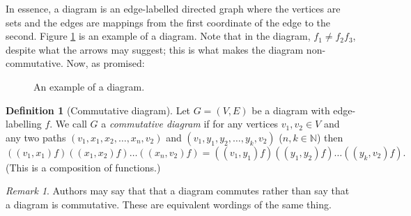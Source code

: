 \documentclass[12pt]{article}
\theoremstyle{definition}
\newtheorem{definition}{Definition}
\theoremstyle{remark}
\newtheorem*{remark}{Remark}
\begin{document}
In essence, a diagram is an edge-labelled directed graph where the vertices are sets and the edges are mappings from the first coordinate of the edge to the second. Figure \ref{fig:diag} is an example of a diagram. Note that in the diagram, $f_1 \neq f_2f_3$, despite what the arrows may suggest; this is what makes the diagram non-commutative. Now, as promised:

\begin{figure}[h]
  \centering

  \caption{An example of a diagram.}
  \label{fig:diag}
\end{figure}

\begin{definition}[Commutative diagram]
  \label{def:com-diag}
  Let $G=(V,E)$ be a diagram with edge-labelling $f$. We call $G$ a \textit{commutative diagram} if for any vertices $v_1,v_2\in V$ and any two paths $(v_1,x_1,x_2,\ldots,x_n,v_2)$ and $(v_1,y_1,y_2,\ldots,y_k,v_2)$ ($n,k\in \mathbb{N}$) then $$((v_1,x_1)f)((x_1,x_2)f)\ldots((x_n,v_2)f) = ((v_1,y_1)f)((y_1,y_2)f)\ldots((y_k,v_2)f).$$ (This is a composition of functions.)
\end{definition}

\begin{remark}
  Authors may say that that a diagram commutes rather than say that a diagram is commutative. These are equivalent wordings of the same thing.
\end{remark}
\end{document}
